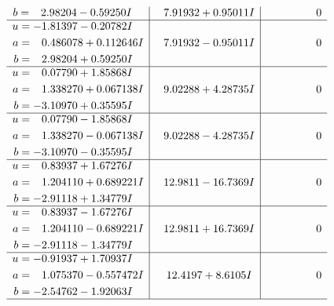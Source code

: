 \documentclass[1p]{elsarticle_modified}
\theoremstyle{definition}
\begin{document}
$$\begin{array}{c|c|c}
\begin{aligned}
b &= \phantom{-}2.98204 - 0.59250 I\end{aligned}
 & \phantom{-}7.91932 + 0.95011 I & \phantom{-0.000000 } 0 \\ \hline\begin{aligned}
u &= -1.81397 - 0.20782 I \\
a &= \phantom{-}0.486078 + 0.112646 I \\
b &= \phantom{-}2.98204 + 0.59250 I\end{aligned}
 & \phantom{-}7.91932 - 0.95011 I & \phantom{-0.000000 } 0 \\ \hline\begin{aligned}
u &= \phantom{-}0.07790 + 1.85868 I \\
a &= \phantom{-}1.338270 + 0.067138 I \\
b &= -3.10970 + 0.35595 I\end{aligned}
 & \phantom{-}9.02288 + 4.28735 I & \phantom{-0.000000 } 0 \\ \hline\begin{aligned}
u &= \phantom{-}0.07790 - 1.85868 I \\
a &= \phantom{-}1.338270 - 0.067138 I \\
b &= -3.10970 - 0.35595 I\end{aligned}
 & \phantom{-}9.02288 - 4.28735 I & \phantom{-0.000000 } 0 \\ \hline\begin{aligned}
u &= \phantom{-}0.83937 + 1.67276 I \\
a &= \phantom{-}1.204110 + 0.689221 I \\
b &= -2.91118 + 1.34779 I\end{aligned}
 & \phantom{-}12.9811 - 16.7369 I & \phantom{-0.000000 } 0 \\ \hline\begin{aligned}
u &= \phantom{-}0.83937 - 1.67276 I \\
a &= \phantom{-}1.204110 - 0.689221 I \\
b &= -2.91118 - 1.34779 I\end{aligned}
 & \phantom{-}12.9811 + 16.7369 I & \phantom{-0.000000 } 0 \\ \hline\begin{aligned}
u &= -0.91937 + 1.70937 I \\
a &= \phantom{-}1.075370 - 0.557472 I \\
b &= -2.54762 - 1.92063 I\end{aligned}
 & \phantom{-}12.4197 + 8.6105 I & \phantom{-0.000000 } 0\\
 \hline 

\end{array}$$
\end{document}
